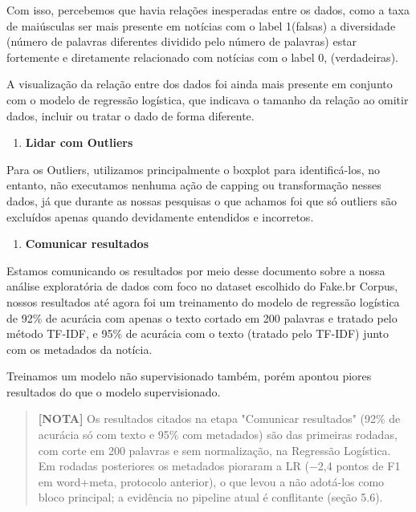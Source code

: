\documentclass[
  brazilian,
  11pt,
]{article}
\providecommand{\tightlist}{%
  \setlength{\itemsep}{0pt}\setlength{\parskip}{0pt}}
\begin{document}
Com isso, percebemos que havia relações inesperadas entre os dados, como a taxa de maiúsculas ser mais presente em notícias com o label 1(falsas) a diversidade (número de palavras diferentes dividido pelo número de palavras) estar fortemente e diretamente relacionado com notícias com o label 0, (verdadeiras).

A visualização da relação entre dos dados foi ainda mais presente em conjunto com o modelo de regressão logística, que indicava o tamanho da relação ao omitir dados, incluir ou tratar o dado de forma diferente.

\begin{enumerate}
\def\labelenumi{\arabic{enumi}.}
\tightlist
\item
  \textbf{Lidar com Outliers}
\end{enumerate}

Para os Outliers, utilizamos principalmente o boxplot para identificá-los, no entanto, não executamos nenhuma ação de capping ou transformação nesses dados, já que durante as nossas pesquisas o que achamos foi que só outliers são excluídos apenas quando devidamente entendidos e incorretos.

\begin{enumerate}
\def\labelenumi{\arabic{enumi}.}
\tightlist
\item
  \textbf{Comunicar resultados}
\end{enumerate}

Estamos comunicando os resultados por meio desse documento sobre a nossa análise exploratória de dados com foco no dataset escolhido do Fake.br Corpus, nossos resultados até agora foi um treinamento do modelo de regressão logística de 92\% de acurácia com apenas o texto cortado em 200 palavras e tratado pelo método TF-IDF, e 95\% de acurácia com o texto (tratado pelo TF-IDF) junto com os metadados da notícia.

Treinamos um modelo não supervisionado também, porém apontou piores resultados do que o modelo supervisionado.

\begin{quote}
\textbf{{[}NOTA{]}} Os resultados citados na etapa "Comunicar resultados" (92\% de acurácia só com texto e 95\% com metadados) são das primeiras rodadas, com corte em 200 palavras e sem normalização, na Regressão Logística. Em rodadas posteriores os metadados pioraram a LR (−2,4 pontos de F1 em word+meta, protocolo anterior), o que levou a não adotá-los como bloco principal; a evidência no pipeline atual é conflitante (seção 5.6).
\end{quote}
\end{document}
